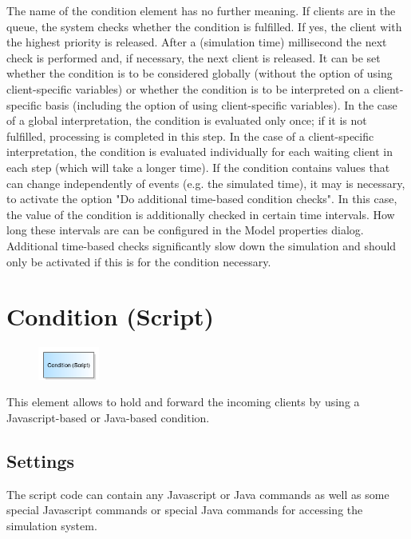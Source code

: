 The name of the condition element has no further meaning.
If clients are in the queue, the system checks whether the condition is fulfilled.
If yes, the client with the highest priority is released. After a (simulation time) millisecond the next check
is performed and, if necessary, the next client is released.
It can be set whether the condition is to be considered globally (without the option of using client-specific variables)
or whether the condition is to be interpreted on a client-specific basis (including the option of using client-specific variables).
In the case of a global interpretation, the condition is evaluated only once; if it is not fulfilled, processing is completed in this step.
In the case of a client-specific interpretation, the condition is evaluated individually for each waiting client in each step (which will take a longer time).
If the condition contains values that can change independently of events (e.g. the simulated time),
it may is necessary, to activate the option "Do additional time-based condition checks". In this case,
the value of the condition is additionally checked in certain time intervals. How long these intervals
are can be configured in the Model properties dialog.
Additional time-based checks significantly slow down the simulation and should only be activated
if this is for the condition necessary.


\section{Condition (Script)}
\label{ref:ModelElementHoldJS}

\begin{figure}
\vspace{-22pt}
\includegraphics[width=2cm]{imageModelElementHoldJS.png}
\vspace{-22pt}
\end{figure}

This element allows to hold and forward the incoming clients by using a
Javascript-based or Java-based condition.

\subsection*{Settings}

The script code can contain any Javascript or Java commands as well as some
special Javascript commands or special Java commands 
for accessing the simulation system.

